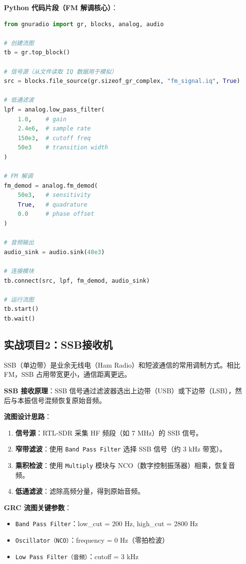 \documentclass[12pt,UTF8]{ctexbook}
\begin{document}
\textbf{Python 代码片段（FM 解调核心）}：

\begin{lstlisting}[language=Python,caption={FM 解调核心代码}]
from gnuradio import gr, blocks, analog, audio

# 创建流图
tb = gr.top_block()

# 信号源（从文件读取 IQ 数据用于模拟）
src = blocks.file_source(gr.sizeof_gr_complex, "fm_signal.iq", True)

# 低通滤波
lpf = analog.low_pass_filter(
    1.0,    # gain
    2.4e6,  # sample rate
    150e3,  # cutoff freq
    50e3    # transition width
)

# FM 解调
fm_demod = analog.fm_demod(
    50e3,   # sensitivity
    True,   # quadrature
    0.0     # phase offset
)

# 音频输出
audio_sink = audio.sink(48e3)

# 连接模块
tb.connect(src, lpf, fm_demod, audio_sink)

# 运行流图
tb.start()
tb.wait()
\end{lstlisting}

\subsection{实战项目2：SSB接收机}
\label{subsec:ssb_receiver}

SSB（单边带）是业余无线电（Ham Radio）和短波通信的常用调制方式。相比 FM，SSB 占用带宽更小，通信距离更远。

\textbf{SSB 接收原理}：SSB 信号通过滤波器选出上边带（USB）或下边带（LSB），然后与本振信号混频恢复原始音频。

\textbf{流图设计思路}：
\begin{enumerate}[leftmargin=2cm]
    \item \textbf{信号源}：RTL-SDR 采集 HF 频段（如 7 MHz）的 SSB 信号。
    \item \textbf{窄带滤波}：使用 \texttt{Band Pass Filter} 选择 SSB 信号（约 3 kHz 带宽）。
    \item \textbf{乘积检波}：使用 \texttt{Multiply} 模块与 NCO（数字控制振荡器）相乘，恢复音频。
    \item \textbf{低通滤波}：滤除高频分量，得到原始音频。
\end{enumerate}

\textbf{GRC 流图关键参数}：
\begin{itemize}[leftmargin=2cm]
    \item \texttt{Band Pass Filter}：low\_cut = 200 Hz, high\_cut = 2800 Hz
    \item \texttt{Oscillator（NCO）}：frequency = 0 Hz（零拍检波）
    \item \texttt{Low Pass Filter（音频）}：cutoff = 3 kHz
\end{itemize}
\end{document}

